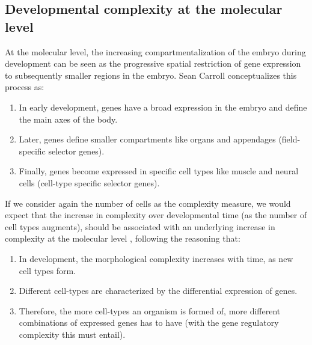 \subsection{Developmental complexity at the molecular level}

At the molecular level, the increasing compartmentalization of the embryo during development can be seen as the progressive spatial restriction of gene expression to subsequently smaller regions in the embryo.
Sean Carroll conceptualizes this process\citep{Carroll2001} as:
\begin{enumerate}
\item In early development, genes have a broad expression in the embryo and define the main axes of the body.
\item Later, genes define smaller compartments like organs and appendages (field-specific selector genes).
\item Finally, genes become expressed in specific cell types like muscle and neural cells (cell-type specific selector genes). 
\end{enumerate}

If we consider again the number of cells as the complexity measure, we would expect that the increase in complexity over developmental time (as the number of cell types augments), should be associated with an underlying increase in complexity at the molecular level \citep{Arthur2010}, following the reasoning that:

\begin{enumerate}
\item In development, the morphological complexity increases with time, as new cell types form.
\item Different cell-types are characterized by the differential expression of genes.
\item Therefore, the more cell-types an organism is formed of, more different combinations of expressed genes has to have (with the gene regulatory complexity this must entail).
\end{enumerate}

